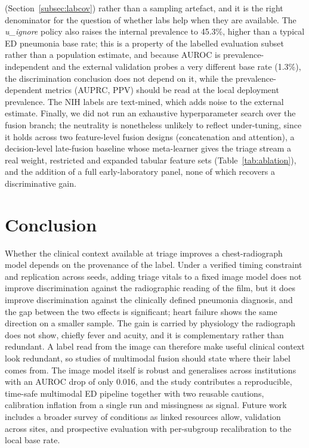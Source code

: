 \documentclass[twocolumn, final]{svjour3}
\begin{document}
(Section~\ref{subsec:labcov}) rather than a sampling artefact, and it is the right
denominator for the question of whether labs help when they are available. The
\emph{u\_ignore} policy also raises the internal prevalence to 45.3\%, higher than a
typical ED pneumonia base rate; this is a property of the labelled evaluation subset
rather than a population estimate, and because AUROC is prevalence-independent and the
external validation probes a very different base rate (1.3\%), the discrimination
conclusion does not depend on it, while the prevalence-dependent metrics (AUPRC, PPV)
should be read at the local deployment prevalence. The NIH labels are text-mined, which
adds noise to the external estimate. Finally, we did not run an exhaustive hyperparameter
search over the fusion branch; the neutrality is nonetheless unlikely to reflect
under-tuning, since it holds across two feature-level fusion designs (concatenation and
attention), a decision-level late-fusion baseline whose meta-learner gives the triage
stream a real weight, restricted and expanded tabular feature sets (Table~\ref{tab:ablation}),
and the addition of a full early-laboratory panel, none of which recovers a discriminative
gain.

\section{Conclusion}
\label{sec:conclusion}
Whether the clinical context available at triage improves a chest-radiograph model
depends on the provenance of the label. Under a verified timing constraint and
replication across seeds, adding triage vitals to a fixed image model does not improve
discrimination against the radiographic reading of the film, but it does improve
discrimination against the clinically defined pneumonia diagnosis, and the gap between the
two effects is significant; heart failure shows the same direction on a smaller sample. The
gain is carried by
physiology the radiograph does not show, chiefly fever and acuity, and it is
complementary rather than redundant. A label read from the image can therefore make
useful clinical context look redundant, so studies of multimodal fusion should state
where their label comes from. The image model itself is robust and generalises across
institutions with an AUROC drop of only 0.016, and the study contributes a reproducible,
time-safe multimodal ED pipeline together with two reusable cautions, calibration
inflation from a single run and missingness as signal. Future work includes a broader
survey of conditions as linked resources allow, validation across sites, and prospective
evaluation with per-subgroup recalibration to the local base rate.
\end{document}
